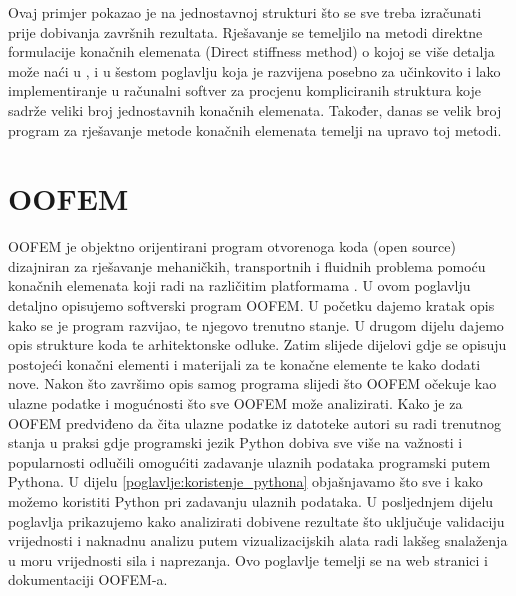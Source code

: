 \documentclass[a4paper,twoside,12pt]{memoir} %
\begin{document}
Ovaj primjer pokazao je na jednostavnoj strukturi što se sve treba izračunati prije dobivanja završnih rezultata. Rješavanje se temeljilo na metodi direktne formulacije konačnih elemenata (Direct stiffness method) o kojoj se više detalja može naći u \cite{direct_stiffness_method_article}, \cite{direct_stiffness_method} i u šestom poglavlju \cite{jurica_soric} koja je razvijena posebno za učinkovito i lako implementiranje u računalni softver za procjenu kompliciranih struktura koje sadrže veliki broj jednostavnih konačnih elemenata. Također, danas se velik broj program za rješavanje metode konačnih elemenata temelji na upravo toj metodi.



\chapter{OOFEM}	
OOFEM je objektno orijentirani program otvorenoga koda (open source) dizajniran za rješavanje mehaničkih, transportnih i fluidnih problema pomoću konačnih elemenata koji radi na različitim platformama \cite{oofem-web}. U ovom poglavlju detaljno opisujemo softverski program OOFEM. U početku dajemo kratak opis kako se je program razvijao, te njegovo trenutno stanje. U drugom dijelu dajemo opis strukture koda te arhitektonske odluke. Zatim slijede dijelovi gdje se opisuju postojeći konačni elementi i materijali za te konačne elemente te kako dodati nove. Nakon što završimo opis samog programa slijedi što OOFEM očekuje kao ulazne podatke i mogućnosti što sve OOFEM može analizirati. Kako je za OOFEM predviđeno da čita ulazne podatke iz datoteke autori su radi trenutnog stanja u praksi gdje programski jezik Python dobiva sve više na važnosti i popularnosti odlučili omogućiti zadavanje ulaznih podataka programski putem Pythona. U dijelu \ref{poglavlje:koristenje_pythona} objašnjavamo što sve i kako možemo koristiti Python pri zadavanju ulaznih podataka. U posljednjem dijelu poglavlja prikazujemo kako analizirati dobivene rezultate što uključuje validaciju vrijednosti i naknadnu analizu putem vizualizacijskih alata radi lakšeg snalaženja u moru vrijednosti sila i naprezanja. Ovo poglavlje temelji se na web stranici i dokumentaciji OOFEM-a. \cite{oofem_article} \cite{oofem-web}
\end{document}
